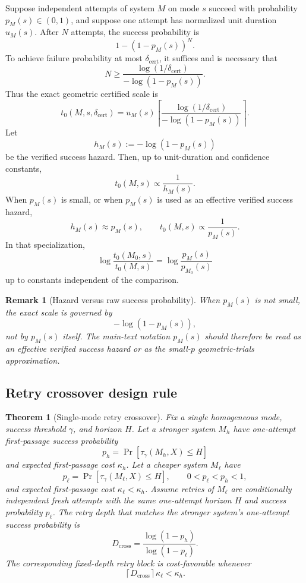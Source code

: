 \documentclass{article}
\newtheorem{theorem}{Theorem}
\newtheorem{remark}{Remark}
\begin{document}
Suppose independent attempts of system \(M\) on mode \(s\) succeed with probability
\(p_M(s)\in(0,1)\), and suppose one attempt has normalized unit duration \(u_M(s)\).
After \(N\) attempts, the success probability is
\[
    1-(1-p_M(s))^N.
\]
To achieve failure probability at most \(\delta_{\mathrm{cert}}\), it suffices and is necessary that
\[
    N
    \ge
    \frac{\log(1/\delta_{\mathrm{cert}})}
         {-\log(1-p_M(s))}.
\]
Thus the exact geometric certified scale is
\[
    t_0(M,s,\delta_{\mathrm{cert}})
    =
    u_M(s)
    \left\lceil
    \frac{\log(1/\delta_{\mathrm{cert}})}
         {-\log(1-p_M(s))}
    \right\rceil.
\]
Let
\[
    h_M(s):=-\log(1-p_M(s))
\]
be the verified success hazard.  Then, up to unit-duration and confidence constants,
\[
    t_0(M,s)\propto \frac{1}{h_M(s)}.
\]
When \(p_M(s)\) is small, or when \(p_M(s)\) is used as an effective verified success
hazard,
\[
    h_M(s)\approx p_M(s),
    \qquad
    t_0(M,s)\propto\frac{1}{p_M(s)}.
\]
In that specialization,
\[
    \log\frac{t_0(M_0,s)}{t_0(M,s)}
    =
    \log\frac{p_M(s)}{p_{M_0}(s)}
\]
up to constants independent of the comparison.

\begin{remark}[Hazard versus raw success probability]
When \(p_M(s)\) is not small, the exact scale is governed by
\[
    -\log(1-p_M(s)),
\]
not by \(p_M(s)\) itself.  The main-text notation \(p_M(s)\) should therefore be read
as an effective verified success hazard or as the small-\(p\) geometric-trials approximation.
\end{remark}

\subsection{Retry crossover design rule}
\label{app:retry-crossover}

\begin{theorem}[Single-mode retry crossover]
\label{thm:crossover}
Fix a single homogeneous mode, success threshold \(\gamma\), and horizon \(H\).
Let a stronger system \(M_h\) have one-attempt first-passage success probability
\[
    p_h=\Pr[\tau_\gamma(M_h,X)\le H]
\]
and expected first-passage cost \(\kappa_h\).  Let a cheaper system \(M_\ell\) have
\[
    p_\ell=\Pr[\tau_\gamma(M_\ell,X)\le H],
    \qquad
    0<p_\ell<p_h<1,
\]
and expected first-passage cost \(\kappa_\ell<\kappa_h\).
Assume retries of \(M_\ell\) are conditionally independent fresh attempts with the same
one-attempt horizon \(H\) and success probability \(p_\ell\).  The retry depth that matches
the stronger system's one-attempt success probability is
\[
    D_{\mathrm{cross}}
    =
    \frac{\log(1-p_h)}{\log(1-p_\ell)}.
\]
The corresponding fixed-depth retry block is cost-favorable whenever
\[
    \left\lceil D_{\mathrm{cross}}\right\rceil\kappa_\ell < \kappa_h .
\]
\end{theorem}
\end{document}
